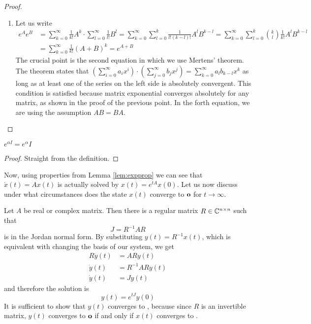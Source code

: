 \begin{proof}
\begin{enumerate}
		\item Let us write 
		\begin{align*}
			e^{A}e^{B}
			&=\sum^\infty_{k=0}\frac{1}{k!}A^{k}\cdot\sum^\infty_{l=0}\frac{1}{l!}B^{l}
			=\sum^\infty_{k=0}\sum^k_{l=0}\frac{1}{l!(k-l)!}A^{l}B^{k-l}
			=\sum^\infty_{k=0}\sum^k_{l=0}\binom{k}{l}\frac{1}{k!}A^{l}B^{k-l}
			\\
			&=\sum^\infty_{k=0}\frac{1}{k!}(A+B)^{k}
			=e^{A+B}
		\end{align*}
		The crucial point is the second equation in which we use Mertens' theorem. The theorem states that $\left(\sum_{i=0}^\infty a_i x^i\right) \cdot(\sum_{j=0}^\infty b_j x^j) = \sum_{k=0}^\infty a_l b_{k-l} x^k$ as long as at least one of the series on the left side is absolutely convergent. This condition is satisfied because matrix exponential converges absolutely for any matrix, as shown in the proof of the previous point. In the forth equation, we are using the assumption $AB=BA$. 
	\end{enumerate}
\end{proof}

\begin{remark}
	$e^{\alpha I}=e^{\alpha}I$
\end{remark}

\begin{proof}
	Straight from the definition.
\end{proof}

Now, using properties from Lemma \ref{lem:expprop} we can see that $\dot{x}(t)=Ax(t)$ is actually solved by $x(t)=e^{tA}x(0)$. Let us now discuss under what circumstances does the state $x(t)$ converge to $\textbf{o}$ for $t\rightarrow\infty$. 

Let $A$ be real or complex matrix. Then there is a regular matrix $R\in \mathbb{C}^{n\times n}$ such that $$J=R^{-1}AR$$ is in the Jordan normal form. By substituting $y(t)=R^{-1}x(t)$, which is equivalent with changing the basis of our system, we get 
\begin{align*}
	R\dot{y}(t)&=ARy(t) \\
	\dot{y}(t)&=R^{-1}ARy(t) \\
	\dot{y}(t)&=Jy(t)
\end{align*}
and therefore the solution is $$y(t)=e^{tJ}y(0)$$ It is sufficient to show that $y(t)$ converges to \nullvector, because since $R$ is an invertible matrix, $y(t)$ converges to $\textbf{o}$ if and only if $x(t)$ converges to \nullvector.


